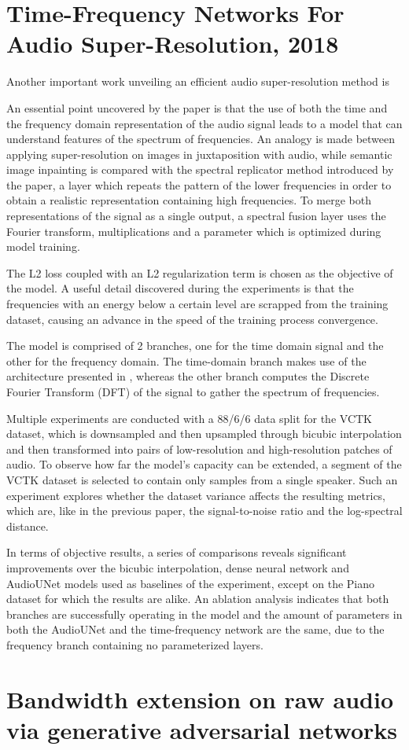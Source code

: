 \documentclass[conference]{IEEEtran}
\begin{document}
	
\section{Time-Frequency Networks For Audio Super-Resolution, 2018}
	Another important work unveiling an efficient audio super-resolution method is \textcite{timefrequencynetworks2018} 

	An essential point uncovered by the paper is that the use of both the time and the frequency domain representation of the audio signal leads to a model that can understand features of the spectrum of frequencies. An analogy is made between applying super-resolution on images in juxtaposition with audio, while semantic image inpainting is compared with the spectral replicator method introduced by the paper, a layer which repeats the pattern of the lower frequencies in order to obtain a realistic representation containing high frequencies. To merge both representations of the signal as a single output, a spectral fusion layer uses the Fourier transform, multiplications and a parameter which is optimized during model training. 

	The L2 loss coupled with an L2 regularization term is chosen as the objective of the model. A useful detail discovered during the experiments is that the frequencies with an energy below a certain level are scrapped from the training dataset, causing an advance in the speed of the training process convergence. 

	The model is comprised of 2 branches, one for the time domain signal and the other for the frequency domain. The time-domain branch makes use of the architecture presented in \textcite{kuleshov2017audio}, whereas the other branch computes the Discrete Fourier Transform (DFT) of the signal to gather the spectrum of frequencies. 

	Multiple experiments are conducted with a 88/6/6 data split for the VCTK dataset, which is downsampled and then upsampled through bicubic interpolation and then transformed into pairs of low-resolution and high-resolution patches of audio. To observe how far the model's capacity can be extended, a segment of the VCTK dataset is selected to contain only samples from a single speaker. Such an experiment explores whether the dataset variance affects the resulting metrics, which are, like in the previous paper, the signal-to-noise ratio and the log-spectral distance. 

	In terms of objective results, a series of comparisons reveals significant improvements over the bicubic interpolation, dense neural network and AudioUNet models used as baselines of the experiment, except on the Piano dataset for which the results are alike. An ablation analysis indicates that both branches are successfully operating in the model and the amount of parameters in both the AudioUNet and the time-frequency network are the same, due to the frequency branch containing no parameterized layers.


\section{Bandwidth extension on raw audio via generative adversarial networks}



	
\printbibliography
\vspace{12pt}
\end{document}
